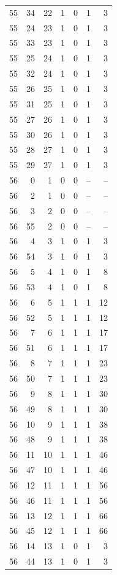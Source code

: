 \begin{longtable}{rrrrrrr}
55 & 34 & 22 & 1 & 0 & 1 & 3\\
55 & 24 & 23 & 1 & 0 & 1 & 3\\
55 & 33 & 23 & 1 & 0 & 1 & 3\\
55 & 25 & 24 & 1 & 0 & 1 & 3\\
55 & 32 & 24 & 1 & 0 & 1 & 3\\
55 & 26 & 25 & 1 & 0 & 1 & 3\\
55 & 31 & 25 & 1 & 0 & 1 & 3\\
55 & 27 & 26 & 1 & 0 & 1 & 3\\
55 & 30 & 26 & 1 & 0 & 1 & 3\\
55 & 28 & 27 & 1 & 0 & 1 & 3\\
55 & 29 & 27 & 1 & 0 & 1 & 3\\
56 & 0 & 1 & 0 & 0 & -- & --\\
56 & 2 & 1 & 0 & 0 & -- & --\\
56 & 3 & 2 & 0 & 0 & -- & --\\
56 & 55 & 2 & 0 & 0 & -- & --\\
56 & 4 & 3 & 1 & 0 & 1 & 3\\
56 & 54 & 3 & 1 & 0 & 1 & 3\\
56 & 5 & 4 & 1 & 0 & 1 & 8\\
56 & 53 & 4 & 1 & 0 & 1 & 8\\
56 & 6 & 5 & 1 & 1 & 1 & 12\\
56 & 52 & 5 & 1 & 1 & 1 & 12\\
56 & 7 & 6 & 1 & 1 & 1 & 17\\
56 & 51 & 6 & 1 & 1 & 1 & 17\\
56 & 8 & 7 & 1 & 1 & 1 & 23\\
56 & 50 & 7 & 1 & 1 & 1 & 23\\
56 & 9 & 8 & 1 & 1 & 1 & 30\\
56 & 49 & 8 & 1 & 1 & 1 & 30\\
56 & 10 & 9 & 1 & 1 & 1 & 38\\
56 & 48 & 9 & 1 & 1 & 1 & 38\\
56 & 11 & 10 & 1 & 1 & 1 & 46\\
56 & 47 & 10 & 1 & 1 & 1 & 46\\
56 & 12 & 11 & 1 & 1 & 1 & 56\\
56 & 46 & 11 & 1 & 1 & 1 & 56\\
56 & 13 & 12 & 1 & 1 & 1 & 66\\
56 & 45 & 12 & 1 & 1 & 1 & 66\\
56 & 14 & 13 & 1 & 0 & 1 & 3\\
56 & 44 & 13 & 1 & 0 & 1 & 3\\

\end{longtable}
